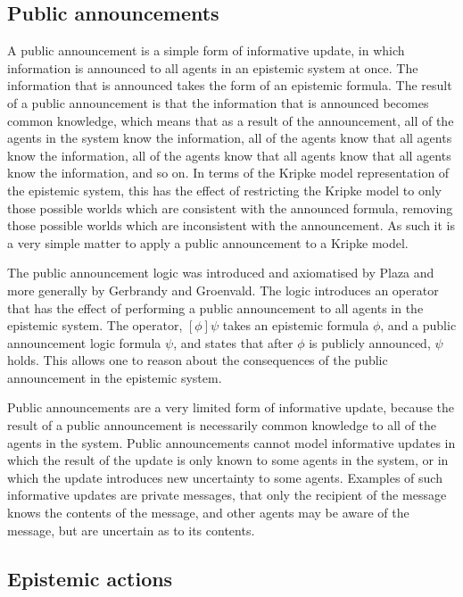 \subsection*{Public announcements}

A public announcement is a simple form of informative update, in which
information is announced to all agents in an epistemic system at once.  The
information that is announced takes the form of an epistemic formula. The result
of a public announcement is that the information that is announced becomes
common knowledge, which means that as a result of the announcement, all of the
agents in the system know the information, all of the agents know that all
agents know the information, all of the agents know that all agents know that
all agents know the information, and so on. In terms of the Kripke model
representation of the epistemic system, this has the effect of restricting the
Kripke model to only those possible worlds which are consistent with the
announced formula, removing those possible worlds which are inconsistent with
the announcement. As such it is a very simple matter to apply a public
announcement to a Kripke model.

The public announcement logic was introduced and axiomatised by
Plaza\cite{plaza2007logics} and more generally by Gerbrandy and
Groenvald\cite{gerbrandy1997reasoning}. The logic introduces an operator that
has the effect of performing a public announcement to all agents in the
epistemic system. The operator, $[\phi]\psi$ takes an epistemic formula $\phi$,
and a public announcement logic formula $\psi$, and states that after $\phi$ is
publicly announced, $\psi$ holds. This allows one to reason about the
consequences of the public announcement in the epistemic system.

Public announcements are a very limited form of informative update, because the
result of a public announcement is necessarily common knowledge to all of the
agents in the system. Public announcements cannot model informative updates in
which the result of the update is only known to some agents in the system, or in
which the update introduces new uncertainty to some agents. Examples of such
informative updates are private messages, that only the recipient of the message
knows the contents of the message, and other agents may be aware of the message,
but are uncertain as to its contents.

\subsection*{Epistemic actions}

